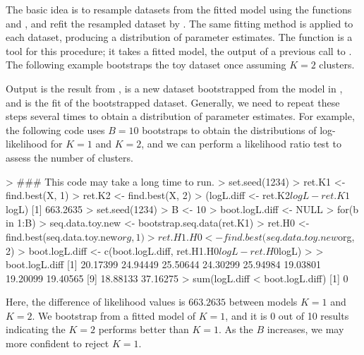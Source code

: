 The basic idea is to resample datasets from the fitted model using the
functions  and ,
and refit the resampled dataset by .
The same fitting method is applied to each
dataset, producing a distribution of parameter estimates.
The  function is a tool for this procedure;
it takes a fitted model, the output of a previous call to .
The following example bootstraps the toy dataset once assuming $K=2$ clusters.
Output  is the result from ,
 is a new dataset bootstrapped from
the model in , and  is the fit
of the bootstrapped dataset.
Generally, we need to repeat these steps several times to obtain
a distribution of parameter estimates.
For example, the following code uses $B = 10$ bootstraps to obtain
the distributions of log-likelihood for $K = 1$ and $K = 2$, and
we can perform a likelihood ratio test to assess the number of clusters.
\begin{Code}
> ### This code may take a long time to run.
> set.seed(1234)
> ret.K1 <- find.best(X, 1)
> ret.K2 <- find.best(X, 2)
> (logL.diff <- ret.K2$logL - ret.K1$logL)
[1] 663.2635
> set.seed(1234)
> B <- 10
> boot.logL.diff <- NULL
> for(b in 1:B){
>   seq.data.toy.new <- bootstrap.seq.data(ret.K1)
>   ret.H0 <- find.best(seq.data.toy.new$org, 1)
>   ret.H1.H0 <- find.best(seq.data.toy.new$org, 2)
>   boot.logL.diff <- c(boot.logL.diff, ret.H1.H0$logL - ret.H0$logL)
> }
> boot.logL.diff
 [1] 20.17399 24.94449 25.50644 24.30299 25.94984 19.03801 19.20099 19.40565
 [9] 18.88133 37.16275
> sum(logL.diff < boot.logL.diff)
[1] 0
\end{Code}
Here, the difference of likelihood values  is $663.2635$
between models $K = 1$ and $K = 2$.
We bootstrap from a fitted model of $K = 1$,
and it is 0 out of 10 results indicating the $K = 2$ performs
better than $K = 1$. As the $B$ increases, we may more confident to
reject $K = 1$.

